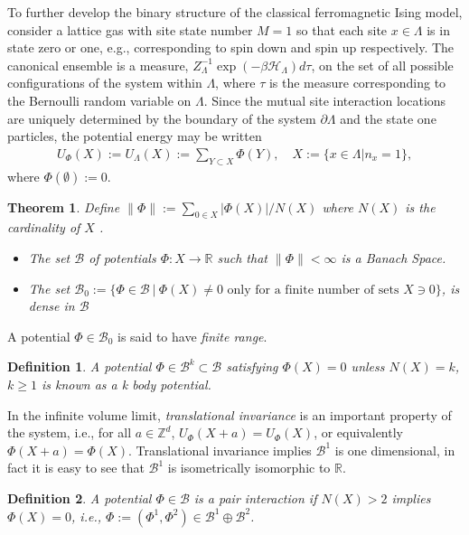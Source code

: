 \documentclass[english,12pt]{ttuthes}
\newtheorem{theorem}{Theorem}[chapter]
\newtheorem{definition}{Definition}[chapter]
\newcommand{\Hc}{\mathcal{H}}
\begin{document}
To further develop the binary structure of the classical ferromagnetic
Ising model, consider a lattice gas with site state number $M=1$ so
that each site $x\in\Lambda$ is in state zero or one, e.g.,
corresponding to spin down and spin up 
respectively. The canonical ensemble is a measure,
$Z_\Lambda^{-1}\exp{(-\beta\Hc_\Lambda)}d\tau$, on the set of all
possible configurations of the system within $\Lambda$, where $\tau$ is the
measure corresponding to the Bernoulli random variable on $\Lambda$. Since the
mutual site interaction locations are uniquely 
determined by the boundary of the system $\partial\Lambda$ and the state one
particles, the potential energy may be written
\cite{Ruelle-1969,Firas}
%
\begin{align}
  U_\Phi (X):= U_\Lambda(X):=\sum_{Y\subset X}\Phi(Y), \quad X:=\{x\in\Lambda|n_x=1\},
\end{align}
%
where $\Phi(\emptyset):=0$.
% 
\begin{theorem}
  Define $\|\Phi\|:=\sum_{0\in X}|\Phi(X)|/N(X)$ where $N(X)$ is the cardinality of
  $X$ \emph{\cite{Ruelle-1969}}.
  \begin{itemize}
  \item[\it{(i)}] The set $\mathscr{B}$ of potentials
    $\Phi:X\to\mathbb{R}$ such that $\|\Phi\|<\infty$ is a Banach Space.
    \item[\it{(ii)}] The set $\mathscr{B}_0:=\{\Phi\in\mathscr{B} \ | \ \Phi(X)\neq0
      \text{ only for a finite number of sets } X\ni0\}$, is dense in
      $\mathscr{B}$          
  \end{itemize}   
\end{theorem}
%
\noindent A potential $\Phi\in\mathscr{B}_0$ is said to have \emph{finite
  range}. 
%
\begin{definition}
  A potential $\Phi\in\mathscr{B}^k\subset\mathscr{B}$ satisfying
$\Phi(X)=0$ unless $N(X)=k$, $k\geq1$ is known as a \emph{k body potential}.  
\end{definition}
%
\noindent In the infinite volume limit, \emph{translational
  invariance} is an important property of the system, i.e., for all
$a\in\mathbb{Z}^d$, $U_\Phi(X+a)=U_\Phi(X)$, or equivalently
$\Phi(X+a)=\Phi(X)$. Translational invariance implies $\mathscr{B}^1$ is one
dimensional, in fact it is easy to see that $\mathscr{B}^1$ is
isometrically isomorphic to $\mathbb{R}$. 
% 
\begin{definition}
  \label{def:Pair_Interaction}
  A potential $\Phi\in\mathscr{B}$ is a \emph{pair interaction} if
  $N(X)>2$ implies $\Phi(X)=0$, i.e., $\Phi:=(\Phi^1,\Phi^2)\in\mathscr{B}^1\oplus\mathscr{B}^2$. 
\end{definition}
\end{document}
